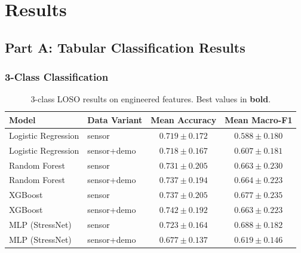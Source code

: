 \documentclass[11pt]{article}
\begin{document}
\section{Results}
\label{sec:results}

\subsection{Part A: Tabular Classification Results}

\subsubsection{3-Class Classification}

\begin{table}[H]
\centering
\caption{3-class LOSO results on engineered features. Best values in \textbf{bold}.}
\label{tab:3class}
\begin{tabular}{llcc}
\toprule
\textbf{Model} & \textbf{Data Variant} & \textbf{Mean Accuracy} & \textbf{Mean Macro-F1} \\
\midrule
Logistic Regression & sensor        & $0.719 \pm 0.172$ & $0.588 \pm 0.180$ \\
Logistic Regression & sensor+demo   & $0.718 \pm 0.167$ & $0.607 \pm 0.181$ \\
\midrule
Random Forest       & sensor        & $0.731 \pm 0.205$ & $0.663 \pm 0.230$ \\
Random Forest       & sensor+demo   & $0.737 \pm 0.194$ & $0.664 \pm 0.223$ \\
\midrule
XGBoost             & sensor        & $0.737 \pm 0.205$ & $\mathbf{0.677 \pm 0.235}$ \\
XGBoost             & sensor+demo   & $\mathbf{0.742 \pm 0.192}$ & $0.663 \pm 0.223$ \\
\midrule
MLP (StressNet)     & sensor        & $0.723 \pm 0.164$ & $0.688 \pm 0.182$ \\
MLP (StressNet)     & sensor+demo   & $0.677 \pm 0.137$ & $0.619 \pm 0.146$ \\
\bottomrule
\end{tabular}
\end{table}
\end{document}

